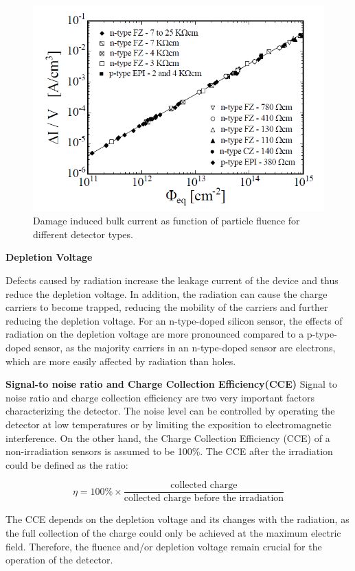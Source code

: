 \begin{figure}[!h]
\centering
\includegraphics[width=0.65\columnwidth]{Chapter2/images/lekage_current_fluence.png}
\caption{Damage induced bulk current as function of particle fluence
for different detector types.}
\label{fig_leakage_theory}
\end{figure}
\newpage
\textbf{Depletion Voltage}\bigbreak

Defects caused by radiation increase the leakage current of the device and thus reduce the depletion voltage. In addition, the radiation can cause the charge carriers to become trapped, reducing the mobility of the carriers and further reducing the depletion voltage. For an n-type-doped silicon sensor, the effects of radiation on the depletion voltage are more pronounced compared to a p-type-doped sensor, as the majority carriers in an n-type-doped sensor are electrons, which are more easily affected by radiation than holes.  \bigbreak

\textbf{Signal-to noise ratio and Charge Collection Efficiency(CCE)}\bigbreak
Signal to noise ratio and charge collection efficiency are two very important factors characterizing the detector. The noise level can be controlled by operating the detector at low temperatures or by limiting the exposition to electromagnetic interference. On the other hand, the Charge Collection Efficiency (CCE) of a non-irradiation sensors is assumed to be 100\%. The CCE after the irradiation could be defined as the ratio:

\begin{equation}
    \eta = 100\%\times\frac{\text{collected charge}}{\text{collected charge before the irradiation}}
\end{equation}

The CCE depends on the depletion voltage and its changes with the radiation, as the full collection of the charge could only be achieved at the maximum electric field. Therefore, the fluence and/or depletion voltage remain crucial for the operation of the detector. 

